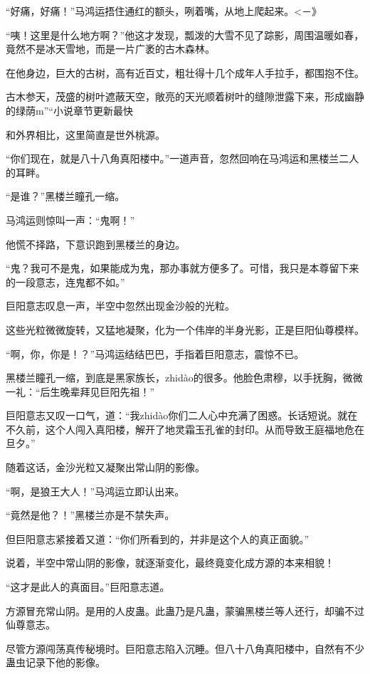 
\begin{this_body}

“好痛，好痛！”马鸿运捂住通红的额头，咧着嘴，从地上爬起来。<－》

“咦！这里是什么地方啊？”他这才发现，瓢泼的大雪不见了踪影，周围温暖如春，竟然不是冰天雪地，而是一片广袤的古木森林。

在他身边，巨大的古树，高有近百丈，粗壮得十几个成年人手拉手，都围抱不住。

古木参天，茂盛的树叶遮蔽天空，敞亮的天光顺着树叶的缝隙泄露下来，形成幽静的绿荫m”“小说章节更新最快

和外界相比，这里简直是世外桃源。

“你们现在，就是八十八角真阳楼中。”一道声音，忽然回响在马鸿运和黑楼兰二人的耳畔。

“是谁？”黑楼兰瞳孔一缩。

马鸿运则惊叫一声：“鬼啊！”

他慌不择路，下意识跑到黑楼兰的身边。

“鬼？我可不是鬼，如果能成为鬼，那办事就方便多了。可惜，我只是本尊留下来的一段意志，连鬼都不如。”

巨阳意志叹息一声，半空中忽然出现金沙般的光粒。

这些光粒微微旋转，又猛地凝聚，化为一个伟岸的半身光影，正是巨阳仙尊模样。

“啊，你，你是！？”马鸿运结结巴巴，手指着巨阳意志，震惊不已。

黑楼兰瞳孔一缩，到底是黑家族长，zhidào的很多。他脸色肃穆，以手抚胸，微微一礼：“后生晚辈拜见巨阳先祖！”

巨阳意志又叹一口气，道：“我zhidào你们二人心中充满了困惑。长话短说。就在不久前，这个人闯入真阳楼，解开了地灵霜玉孔雀的封印。从而导致王庭福地危在旦夕。”

随着这话，金沙光粒又凝聚出常山阴的影像。

“啊，是狼王大人！”马鸿运立即认出来。

“竟然是他？！”黑楼兰亦是不禁失声。

但巨阳意志紧接着又道：“你们所看到的，并非是这个人的真正面貌。”

说着，半空中常山阴的影像，就逐渐变化，最终竟变化成方源的本来相貌！

“这才是此人的真面目。”巨阳意志道。

方源冒充常山阴。是用的人皮蛊。此蛊乃是凡蛊，蒙骗黑楼兰等人还行，却骗不过仙尊意志。

尽管方源闯荡真传秘境时。巨阳意志陷入沉睡。但八十八角真阳楼中，自然有不少蛊虫记录下他的影像。


\end{this_body}
